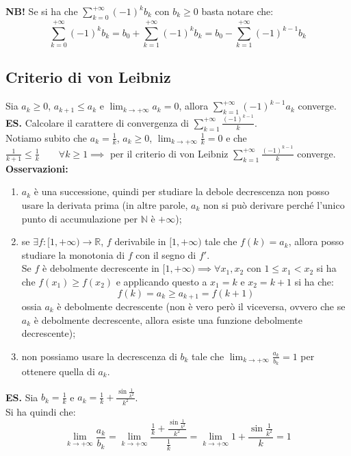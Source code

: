 \documentclass{article}
\begin{document}
\noindent\textbf{NB!} Se si ha che $\sum_{k = 0}^{+\infty} (-1)^kb_k$ con $b_k \geq 0$ basta notare che:
\begin{equation*}
    \sum_{k = 0}^{+\infty} (-1)^k b_k = b_0 + \sum_{k = 1}^{+\infty} (-1)^k b_k = b_0 - \sum_{k = 1}^{+\infty} (-1)^{k - 1} b_k
\end{equation*}

\subsection{Criterio di von Leibniz}
Sia $a_k \geq 0$, $a_{k + 1} \leq a_k$ e $\lim_{k \to +\infty} a_k = 0$, allora $\sum_{k = 1}^{+\infty} (-1)^{k - 1} a_k$ converge.\\

\noindent\textbf{ES.} Calcolare il carattere di convergenza di $\sum_{k = 1}^{+\infty} \frac{(-1)^{k - 1}}{k}$.\\
Notiamo subito che $a_k = \frac{1}{k}$, $a_k \geq 0$, $\lim_{k \to +\infty} \frac{1}{k} = 0$ e che $\frac{1}{k + 1} \leq \frac{1}{k} \qquad \forall k \geq 1 \implies$ per il criterio di von Leibniz $\sum_{k = 1}^{+\infty} \frac{(-1)^{k - 1}}{k}$ converge.\\

\noindent\textbf{Osservazioni:}
\begin{enumerate}
    \item $a_k$ è una successione, quindi per studiare la debole decrescenza non posso usare la derivata prima (in altre parole, $a_k$ non si può derivare perché l'unico punto di accumulazione per $\mathbb{N}$ è $+\infty$);
    \item se $\exists f: [1, +\infty) \xrightarrow{} \mathbb{R}$, $f$ derivabile in $[1, +\infty)$ tale che $f(k) = a_k$, allora posso studiare la monotonia di $f$ con il segno di $f'$. \\
    Se $f$ è debolmente decrescente in $[1, +\infty) \implies \forall x_1, x_2$ con $1 \leq x_1 < x_2$ si ha che $f(x_1) \geq f(x_2)$ e applicando questo a $x_1 = k$ e $x_2 = k + 1$ si ha che: $$f(k) = a_k \geq a_{k + 1} = f(k + 1)$$ ossia $a_k$ è debolmente decrescente (non è vero però il viceversa, ovvero che se $a_k$ è debolmente decrescente, allora esiste una funzione debolmente decrescente);
    \item non possiamo usare la decrescenza di $b_k$ tale che $\lim_{k \to +\infty} \frac{a_k}{b_k} = 1$ per ottenere quella di $a_k$.
\end{enumerate}

\noindent\textbf{ES.} Sia $b_k = \frac{1}{k}$ e $a_k = \frac{1}{k} + \frac{\sin\frac{1}{k^2}}{k^2}$.\\
Si ha quindi che:
\begin{equation*}
    \lim_{k \to +\infty} \frac{a_k}{b_k} = \lim_{k \to +\infty} \frac{\frac{1}{k} + \frac{\sin\frac{1}{k^2}}{k^2}}{\frac{1}{k}} = \lim_{k \to +\infty} 1 + \frac{\sin\frac{1}{k^2}}{k} = 1
\end{equation*}
\end{document}
